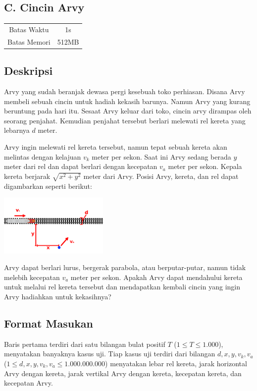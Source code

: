 \documentclass{article}
\begin{document}
\begin{center}
    \section*{C. Cincin Arvy}

    \begin{tabular}{ | c c | }
        \hline
        Batas Waktu  & 1s \\
        Batas Memori & 512MB \\
        \hline
    \end{tabular}
\end{center}

\subsection*{Deskripsi}

Arvy yang sudah beranjak dewasa pergi kesebuah toko perhiasan. Disana Arvy membeli sebuah cincin untuk hadiah kekasih barunya.
Namun Arvy yang kurang beruntung pada hari itu.
Sesaat Arvy keluar dari toko, cincin arvy dirampas oleh seorang penjahat.
Kemudian penjahat tersebut berlari melewati rel kereta yang lebarnya $d$ meter.

Arvy ingin melewati rel kereta tersebut, namun tepat sebuah kereta akan melintas dengan kelajuan $v_k$ meter per sekon.
Saat ini Arvy sedang berada $y$ meter dari rel dan dapat berlari dengan kecepatan $v_a$ meter per sekon.
Kepala kereta berjarak $\sqrt{x^2+y^2}$ meter dari Arvy.
Posisi Arvy, kereta, dan rel dapat digambarkan seperti berikut:

\begin{center}
    \includegraphics[width=200px]{skema}
\end{center}

Arvy dapat berlari lurus, bergerak parabola, atau berputar-putar, namun tidak melebih kecepatan $v_a$ meter per sekon.
Apakah Arvy dapat mendahului kereta untuk melalui rel kereta tersebut dan mendapatkan kembali cincin yang ingin Arvy hadiahkan untuk kekasihnya?

\subsection*{Format Masukan}
Baris pertama terdiri dari satu bilangan bulat positif $T$ ($1 \leq T \leq 1.000$), menyatakan banyaknya kasus uji.
Tiap kasus uji terdiri dari bilangan $d, x, y, v_k, v_a$ ($1 \leq d, x, y, v_k, v_a \leq 1.000.000.000$) menyatakan lebar rel kereta, jarak horizontal Arvy dengan kereta, jarak vertikal Arvy dengan kereta, kecepatan kereta, dan kecepatan Arvy.
\end{document}

